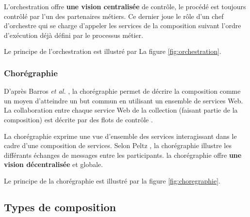         L'orchestration offre \textbf{une vision centralisée} de
        contrôle, le procédé est toujours contrôlé par l'un des
        partenaires métiers. Ce dernier joue le rôle d'un chef
        d'orchestre qui se charge d'appeler les services de la
        composition suivant l'ordre d'exécution déjà défini par le
        processus métier.

        Le principe de l'orchestration est illustré
        par La figure \ref{fig:orchestration}.

        

        \subsubsection{Chorégraphie}
        \label{sec:choregraphie}

        D'après Barros \emph{et al.} \cite{barros2006standards}, la
        chorégraphie permet de décrire la composition comme un moyen
        d'atteindre un but commun en utilisant un ensemble de services
        Web. La collaboration entre chaque service Web de la
        collection (faisant partie de la composition) est décrite par
        des flots de contrôle \cite{lopez2008selection}.

        La chorégraphie exprime une vue d'ensemble des services
        interagissant dans le cadre d'une composition de
        services. Selon Peltz \cite{peltz2003web}, la chorégraphie
        illustre les différants échanges de messages entre les
        participants. la chorégraphie offre \textbf{une vision
          décentralisée} et globale.

        Le principe de la chorégraphie est illustré par la figure
        \ref{fig:choregraphie}.

        

        \newpage
      \subsection{Types de composition}
      \label{sec:types-de-composition}

